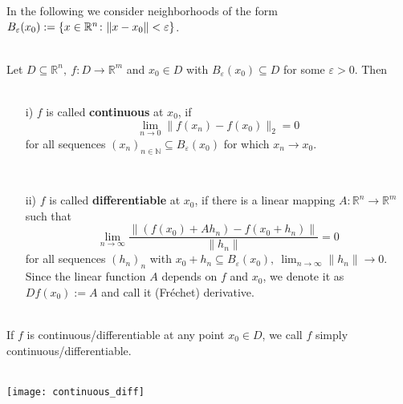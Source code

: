 \begin{frame}
In the following we consider neighborhoods of the form $B_\varepsilon (x_0):= \{x\in {\mathbb{R}}^{n}\colon  \|x-x_0\|< \varepsilon\}$.
\begin{definition}~\\
	Let $D\subseteq\mathbb{R}^n,~f:D\rightarrow\mathbb{R}^m$ and $x_0\in D$ with $B_\varepsilon (x_0)\subseteq D$ for some $\varepsilon>0$. Then
	~\\~\\
	\begin{itemize}
		\item [i)] 
		$f$ is called \textbf{continuous} at $x_0$, if
		$$
		\lim_{n\to 0}\|f(x_n)-f(x_0)\|_2=0
		$$
		for all sequences $(x_n)_{n\in\mathbb{N}}\subseteq B_\varepsilon (x_0)$ for which $x_n\to x_0$.
		
		~\\
		\item [ii)]
		$f$ is called \textbf{differentiable} at $x_0$, if there is a linear mapping $A:\mathbb{R}^n\rightarrow\mathbb{R}^m$ such that
		$$
		\lim_{n\to\infty}\frac{\|(f(x_0)+Ah_n)-f(x_0+h_n)\|}{\|h_n\|}=0
		$$
		for all sequences $(h_n)_n$ with $x_0+h_n\subseteq B_\varepsilon (x_0),~\lim_{n\to\infty}\|h_n\|\to 0$.
		~\\
		Since the linear function $A$ depends on $f$ and $x_0$, we denote it as $Df(x_0):=A$ and call it (Fr\'{e}chet) derivative.
	\end{itemize}
~\\
	If $f$ is continuous/differentiable at any point $x_0\in D$, we call $f$ simply  continuous/differentiable.
\end{definition}
\end{frame}

\begin{frame}
~\\
\texttt{[image: continuous\_diff]}
\end{frame}

